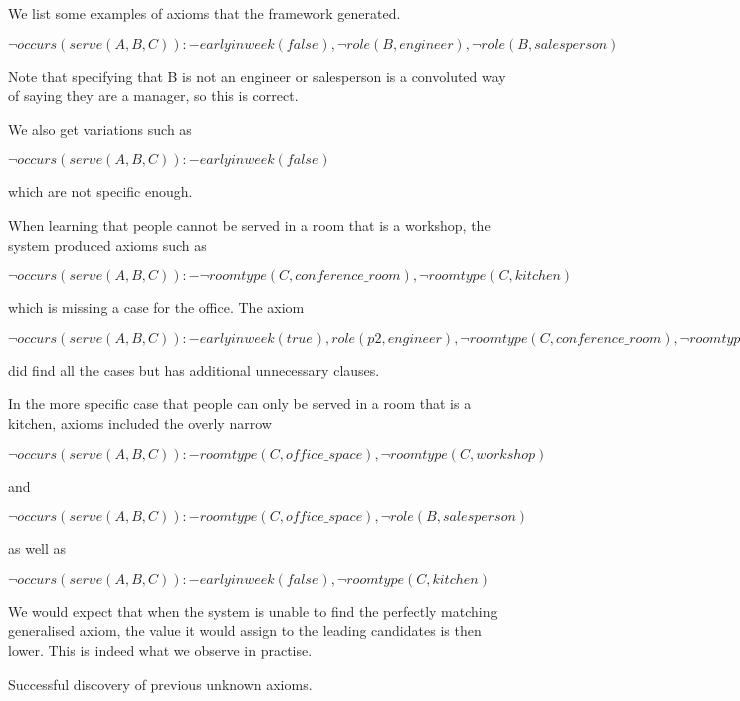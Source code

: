 We list some examples of axioms that the framework generated.

$\neg occurs(serve(A,B,C)) :- earlyinweek(false), \neg role(B,engineer), \neg role(B,salesperson)$

Note that specifying that B is not an engineer or salesperson is a 
convoluted way of saying they are a manager, so this is correct.

We also get variations such as 

$\neg occurs(serve(A,B,C)) :- earlyinweek(false)$

which are not specific enough.

When learning that people cannot be served in a room that is a workshop, the system produced
axioms such as 

$\neg occurs(serve(A,B,C)) :- \neg roomtype(C,conference\_room), \neg roomtype(C,kitchen)$

which is missing a case for the office. The axiom

$\neg occurs(serve(A,B,C)) :- earlyinweek(true), role(p2, engineer), \neg roomtype(C, conference\_room),
\neg roomtype(C, kitchen), \neg roomtype(C, office\_space)$

did find all the cases but has additional unnecessary clauses.

In the more specific case that people can only be served in a room that is a kitchen, 
axioms included the overly narrow

$\neg occurs(serve(A,B,C)) :- roomtype(C,office\_space), \neg roomtype(C,workshop)$

and

$\neg occurs(serve(A,B,C)) :- roomtype(C, office\_space), \neg role(B, salesperson)$

as well as 

$\neg occurs(serve(A,B,C)) :- earlyinweek(false), \neg roomtype(C, kitchen)$

%

We would expect that when the system is unable to find the perfectly matching 
generalised axiom, the value it would assign to the leading candidates is then lower. 
This is indeed what we observe in practise.

Successful discovery of previous unknown axioms.







